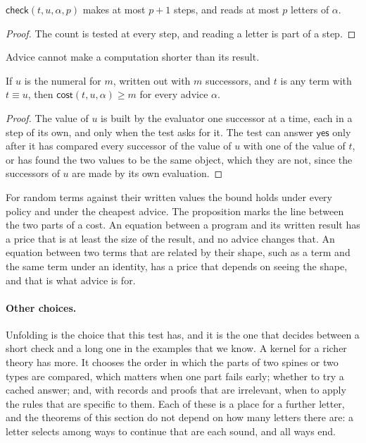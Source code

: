 \documentclass[acmsmall,nonacm,screen]{acmart}
\newcommand{\kw}[1]{\mathsf{#1}}
\newcommand{\conv}{\equiv}
\newcommand{\chk}[4]{\kw{check}(#1, #2, #3, #4)}
\newcommand{\yes}{\kw{yes}}
\newcommand{\cost}[3]{\kw{cost}(#1, #2, #3)}
\newcommand{\claim}[2]{#2}
\begin{document}
\begin{theorem}
\label{thm:price}
$\chk{t}{u}{\alpha}{p}$ makes at most $p + 1$ steps, and reads at most $p$ letters of
$\alpha$.
\end{theorem}

\begin{proof}
The count is tested at every step, and reading a letter is part of a step.
\end{proof}

Advice cannot make a computation shorter than its result.

\begin{proposition}
\label{prop:literal}
If $u$ is the numeral for $m$, written out with $m$ successors, and $t$ is any term with $t
\conv u$, then $\cost{t}{u}{\alpha} \ge m$ for every advice $\alpha$.
\end{proposition}

\begin{proof}
The value of $u$ is built by the evaluator one successor at a time, each in a step of its
own, and only when the test asks for it. The test can answer $\yes$ only after it has
compared every successor of the value of $u$ with one of the value of $t$, or has found the
two values to be the same object, which they are not, since the successors of $u$ are made
by its own evaluation.
\end{proof}

\claim{literal}{For \exLiteralPairs{} random terms against their written values the bound holds
under every policy and under the cheapest advice.} The proposition marks the line between the
two parts of a cost. An equation between a program and its written result has a price that
is at least the size of the result, and no advice changes that. An equation between two
terms that are related by their shape, such as a term and the same term under an identity,
has a price that depends on seeing the shape, and that is what advice is for.

\paragraph{Other choices.} Unfolding is the choice that this test has, and it is the one that
decides between a short check and a long one in the examples that we know. A kernel for a
richer theory has more. It chooses the order in which the parts of two spines or two types
are compared, which matters when one part fails early; whether to try a cached answer; and,
with records and proofs that are irrelevant, when to apply the rules that are specific to
them. Each of these is a place for a further letter, and the theorems of this section do not
depend on how many letters there are: a letter selects among ways to continue that are each
sound, and all ways end.
\end{document}
